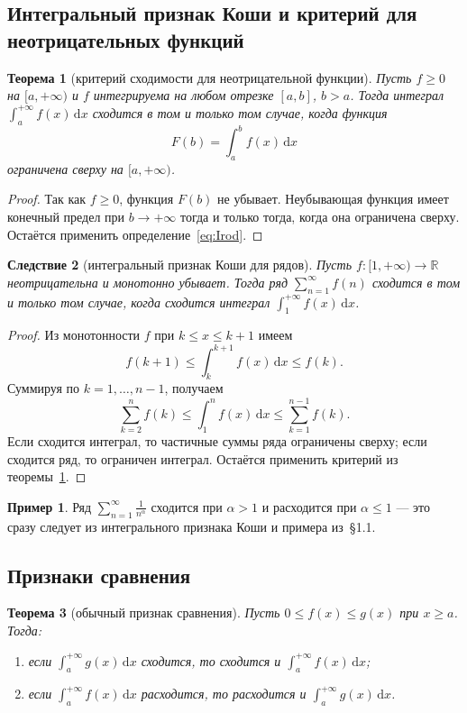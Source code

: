 \documentclass[12pt,a4paper]{article}
\newtheorem{theorem}{Теорема}[section]
\newtheorem{corollary}[theorem]{Следствие}
\theoremstyle{definition}
\newtheorem{example}{Пример}[section]
\newcommand{\R}{\mathbb{R}}
\newcommand{\dd}{\,\mathrm{d}}
\begin{document}
\subsection{Интегральный признак Коши и критерий для неотрицательных функций}

\begin{theorem}[критерий сходимости для неотрицательной функции]\label{th:nonneg}
Пусть $f\ge 0$ на $[a,+\infty)$ и $f$ интегрируема на любом отрезке $[a,b]$, $b>a$. Тогда интеграл $\int_a^{+\infty}f(x)\dd x$ сходится в том и только том случае, когда функция
\[
F(b)=\int_a^b f(x)\dd x
\]
ограничена сверху на $[a,+\infty)$.
\end{theorem}

\begin{proof}
Так как $f\ge 0$, функция $F(b)$ не убывает. Неубывающая функция имеет конечный предел при $b\to+\infty$ тогда и только тогда, когда она ограничена сверху. Остаётся применить определение~\eqref{eq:Irod}.
\end{proof}

\begin{corollary}[интегральный признак Коши для рядов]
Пусть $f\colon[1,+\infty)\to\R$ неотрицательна и монотонно убывает. Тогда ряд $\sum_{n=1}^{\infty}f(n)$ сходится в том и только том случае, когда сходится интеграл $\int_1^{+\infty}f(x)\dd x$.
\end{corollary}

\begin{proof}
Из монотонности $f$ при $k\le x\le k+1$ имеем
\[
f(k+1)\le\int_k^{k+1}f(x)\dd x\le f(k).
\]
Суммируя по $k=1,\dots,n-1$, получаем
\[
\sum_{k=2}^{n}f(k)\le\int_1^n f(x)\dd x\le\sum_{k=1}^{n-1}f(k).
\]
Если сходится интеграл, то частичные суммы ряда ограничены сверху; если сходится ряд, то ограничен интеграл. Остаётся применить критерий из теоремы~\ref{th:nonneg}.
\end{proof}

\begin{example}
Ряд $\sum_{n=1}^{\infty}\frac{1}{n^\alpha}$ сходится при $\alpha>1$ и расходится при $\alpha\le 1$ — это сразу следует из интегрального признака Коши и примера из~\S1.1.
\end{example}

\subsection{Признаки сравнения}

\begin{theorem}[обычный признак сравнения]\label{th:compare1}
Пусть $0\le f(x)\le g(x)$ при $x\ge a$. Тогда:
\begin{enumerate}[label=\alph*)]
\item если $\int_a^{+\infty}g(x)\dd x$ сходится, то сходится и $\int_a^{+\infty}f(x)\dd x$;
\item если $\int_a^{+\infty}f(x)\dd x$ расходится, то расходится и $\int_a^{+\infty}g(x)\dd x$.
\end{enumerate}
\end{theorem}
\end{document}
